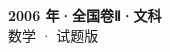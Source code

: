 \documentclass[zihao=-4, a4paper]{ctexart}
\begin{document}
\begin{center}
  {\Large\bfseries 2006 年·全国卷Ⅱ·文科}\\[4pt]
  {\large 数学 · 试题版}
\end{center}
\medskip
{}

\end{document}
